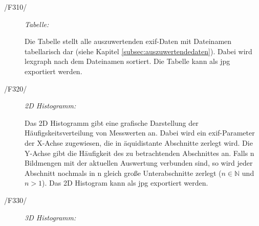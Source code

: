 	\begin{description}

		\item[/F310/] \textit{Tabelle:}\par 
		
			\begin{figure}[H]
				\centering
			\end{figure}			
			Die Tabelle stellt alle auszuwertenden \gls{exif}-Daten mit Dateinamen tabellarisch dar (siehe Kapitel \ref{subsec:auszuwertendedaten}). Dabei wird \gls{lexgraph} nach dem Dateinamen sortiert. Die Tabelle kann als \gls{jpg} exportiert werden.

		\item[/F320/] \textit{2D Histogramm:}\par 
		
			\begin{figure}[H]
				\centering
			\end{figure}
			Das 2D Histogramm gibt eine grafische Darstellung der Häufigskeitsverteilung von Messwerten an. Dabei wird ein \gls{exif}-Parameter der X-Achse zugewiesen, die in äquidistante Abschnitte zerlegt wird. Die Y-Achse gibt die Häufigkeit des zu betrachtenden Abschnittes an. Falls n Bildmengen mit der aktuellen Auswertung verbunden sind, so wird jeder Abschnitt nochmals in n gleich große Unterabschnitte zerlegt ($ n \in \mathbb{N} $ und $ n>1 $). Das 2D Histogram kann als \gls{jpg} exportiert werden.
			

		\item[/F330/] \textit{3D Histogramm:}\par
			

\end{description}
